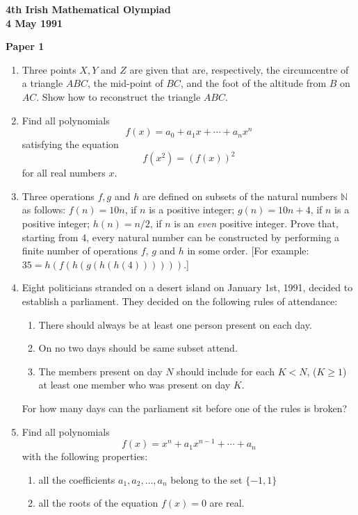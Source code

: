 \documentclass[12pt]{article}
\begin{document}
\begin{center}
{\large\bfseries 4th Irish Mathematical Olympiad\\
4 May 1991}
\end{center}

\bigskip
\noindent\textbf{Paper 1}
\bigskip

\begin{enumerate}
\item Three points $X, Y$ and $Z$ are given that are, respectively, the circumcentre of a triangle $ABC$, the mid-point of $BC$, and the foot of the altitude from $B$ on $AC$. Show how to reconstruct the triangle $ABC$.

\item Find all polynomials \[f(x) = a_0 + a_1x + \cdots + a_nx^n\] satisfying the equation \[f(x^2) = (f(x))^2\] for all real numbers $x$.

\item Three operations $f, g$ and $h$ are defined on subsets of the natural numbers $\mathbb{N}$ as follows: $f(n) = 10n$, if $n$ is a positive integer; $g(n) = 10n + 4$, if $n$ is a positive integer; $h(n) = n/2$, if $n$ is an \emph{even} positive integer. Prove that, starting from 4, every natural number can be constructed by performing a finite number of operations $f$, $g$ and $h$ in some order. [For example: $35 = h(f(h(g(h(h(4))))))$.]

\item Eight politicians stranded on a desert island on January 1st, 1991, decided to establish a parliament. They decided on the following rules of attendance: \begin{enumerate} \item[(a)] There should always be at least one person present on each day. \item[(b)] On no two days should be same subset attend. \item[(c)] The members present on day $N$ should include for each $K < N$, ($K \ge 1$) at least one member who was present on day $K$. \end{enumerate} For how many days can the parliament sit before one of the rules is broken?

\item Find all polynomials \[f(x) = x^n + a_1x^{n-1} + \cdots + a_n\] with the following properties: \begin{enumerate} \item[(a)] all the coefficients $a_1, a_2, \ldots, a_n$ belong to the set $\{-1, 1\}$ \item[(b)] all the roots of the equation $f(x) = 0$ are real. \end{enumerate}

\end{enumerate}
\end{document}
